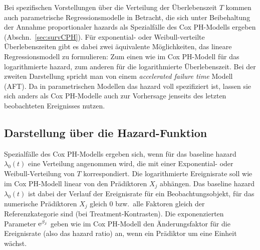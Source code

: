 Bei spezifischen Vorstellungen über die Verteilung der Überlebenszeit $T$ kommen auch parametrische Regressionsmodelle in Betracht, die sich unter Beibehaltung der Annahme proportionaler hazards als Spezialfälle des Cox PH-Modells ergeben (Abschn.\ \ref{sec:survCPH}). Für exponential- oder Weibull-verteilte Überlebenszeiten gibt es dabei zwei äquivalente Möglichkeiten, das lineare Regressionsmodell zu formulieren: Zum einen wie im Cox PH-Modell für das logarithmierte hazard, zum anderen für die logarithmierte Überlebenszeit. Bei der zweiten Darstellung spricht man von einem \emph{accelerated failure time} Modell (AFT).  Da in parametrischen Modellen das hazard voll spezifiziert ist, lassen sie sich anders als Cox PH-Modelle auch zur Vorhersage jenseits des letzten beobachteten Ereignisses nutzen.

\subsection{Darstellung über die Hazard-Funktion}

Spezialfälle des Cox PH-Modells ergeben sich, wenn für das baseline hazard $\lambda_{0}(t)$ eine Verteilung angenommen wird, die mit einer Exponential- oder Weibull-Verteilung von $T$ korrespondiert. Die logarithmierte Ereignisrate soll wie im Cox PH-Modell linear von den Prädiktoren $X_{j}$ abhängen. Das baseline hazard $\lambda_{0}(t)$ ist dabei der Verlauf der Ereignisrate für ein Beobachtungsobjekt, für das numerische Prädiktoren $X_{j}$ gleich $0$ bzw.\ alle Faktoren gleich der Referenzkategorie sind (bei Treatment-Kontrasten). Die exponenzierten Parameter ${\mathrm{e}}^{\beta_{j}}$ geben wie im Cox PH-Modell den Änderungsfaktor für die Ereignisrate (also das hazard ratio) an, wenn ein Prädiktor um eine Einheit wächst.

